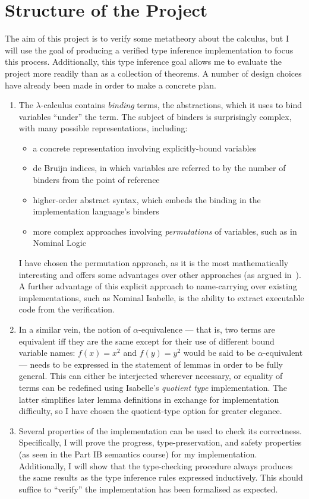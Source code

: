 \documentclass[12pt]{article}
\begin{document}
\section*{Structure of the Project}
The aim of this project is to verify some metatheory about the calculus, but I will use the goal of producing a verified type inference implementation to focus this process.
Additionally, this type inference goal allows me to evaluate the project more readily than as a collection of theorems.
A number of design choices have already been made in order to make a concrete plan.
\begin{enumerate}
\item
The \(\lambda\)-calculus contains \emph{binding} terms, the abstractions, which it uses to bind variables ``under'' the term.
The subject of binders is surprisingly complex, with many possible representations, including:
\begin{itemize}
\item
a concrete representation involving explicitly-bound variables
\item
de Bruijn indices, in which variables are referred to by the number of binders from the point of reference
\item
higher-order abstract syntax, which embeds the binding in the implementation language's binders
\item
more complex approaches involving \emph{permutations} of variables, such as in Nominal Logic~\parencite{binding}
\end{itemize}
I have chosen the permutation approach, as it is the most mathematically interesting and offers some advantages over other approaches (as argued in~\parencite{binding}).
A further advantage of this explicit approach to name-carrying over existing implementations, such as Nominal Isabelle, is the ability to extract executable code from the verification.

\item
In a similar vein, the notion of \(\alpha\)-equivalence --- that is, two terms are equivalent iff they are the same except for their use of different bound variable names: \(f(x) = x^2\) and \(f(y) = y^2\) would be said to be \(\alpha\)-equivalent --- needs to be expressed in the statement of lemmas in order to be fully general.
This can either be interjected wherever necessary, or equality of terms can be redefined using Isabelle's \emph{quotient type} implementation.
The latter simplifies later lemma definitions in exchange for implementation difficulty, so I have chosen the quotient-type option for greater elegance.
\item
Several properties of the implementation can be used to check its correctness.
Specifically, I will prove the progress, type-preservation, and safety properties (as seen in the Part IB semantics course) for my implementation.
Additionally, I will show that the type-checking procedure always produces the same results as the type inference rules expressed inductively.
This should suffice to ``verify'' the implementation has been formalised as expected.
\end{enumerate}
\end{document}
